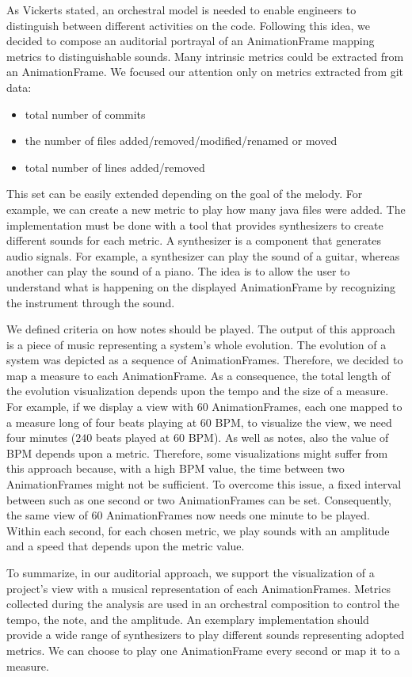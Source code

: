 As Vickerts \cite{Vickers2004} stated, an orchestral model is needed to enable engineers to distinguish between different activities on the code. Following this idea, we decided to compose an auditorial portrayal of an  AnimationFrame mapping metrics to distinguishable sounds. Many intrinsic metrics could be extracted from an AnimationFrame. We focused our attention only on metrics extracted from git data:
\begin{itemize}
    \item total number of commits
    \item the number of files added/removed/modified/renamed or moved
    \item total number of lines added/removed
\end{itemize}
This set can be easily extended depending on the goal of the melody. For example, we can create a new metric to play how many java files were added. The implementation must be done with a tool that provides synthesizers to create different sounds for each metric. A synthesizer is a component that generates audio signals. For example, a synthesizer can play the sound of a guitar, whereas another can play the sound of a piano. The idea is to allow the user to understand what is happening on the displayed AnimationFrame by recognizing the instrument through the sound. 

We defined criteria on how notes should be played. The output of this approach is a piece of music representing a system's whole evolution. The evolution of a system was depicted as a sequence of AnimationFrames. Therefore, we decided to map a measure to each AnimationFrame. As a consequence, the total length of the evolution visualization depends upon the tempo and the size of a measure. 
For example, if we display a view with 60 AnimationFrames, each one mapped to a measure long of four beats playing at 60 BPM, to visualize the view, we need four minutes ($240$ beats played at $60$ BPM). As well as notes, also the value of BPM depends upon a metric. Therefore, some visualizations might suffer from this approach because, with a high BPM value, the time between two AnimationFrames might not be sufficient. To overcome this issue, a fixed interval between such as one second or two AnimationFrames can be set. Consequently, the same view of 60 AnimationFrames now needs one minute to be played. Within each second, for each chosen metric, we play sounds with an amplitude and a speed that depends upon the metric value. 

To summarize, in our auditorial approach, we support the visualization of a project's view with a musical representation of each AnimationFrames. Metrics collected during the analysis are used in an orchestral composition to control the tempo, the note, and the amplitude. An exemplary implementation should provide a wide range of synthesizers to play different sounds representing adopted metrics. We can choose to play one AnimationFrame every second or map it to a measure. 










